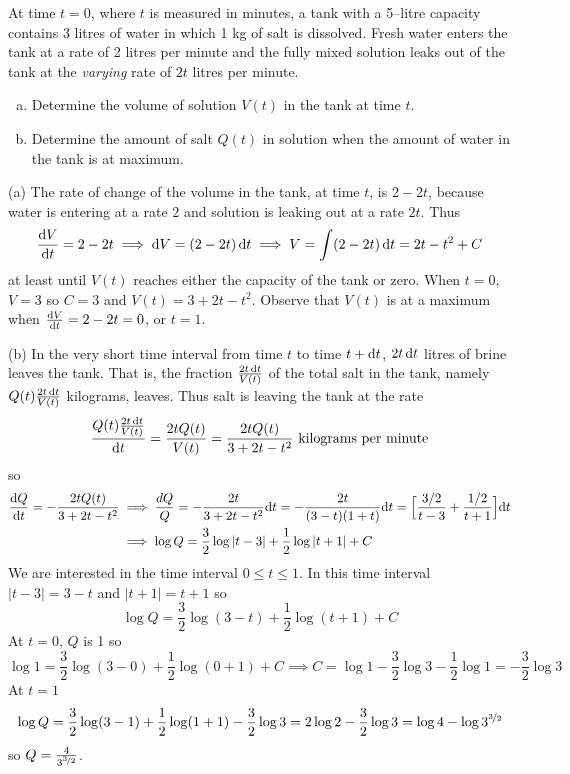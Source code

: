 \begin{eg}\label{eg:SDEmixingA}
At time $t=0$, where $t$ is measured in minutes, a tank with
a 5--litre capacity contains 3 litres of water in which 1 kg of salt
is dissolved. Fresh water enters the tank at a rate of 2 litres per
minute and the fully mixed solution leaks out of the tank at the
\emph{varying} rate of $2t$ litres per minute.
\begin{enumerate}[(a)]
\item Determine the volume of solution $V(t)$ in the tank at time
$t$.
\item Determine the amount of salt $Q(t)$ in solution when the
amount of water in the tank is at maximum.
\end{enumerate}

\soln (a) The rate of change of the volume in the tank, at time $t$,
is $2-2t$, because water is entering at a rate $2$ and solution is
leaking out at a rate $2t$. Thus
\begin{equation*}
\diff{V}{t}=2-2t
\implies \dee{V}=(2-2t)\,\dee{t}
\implies V=\int (2-2t)\,\dee{t}
=2t-t^2+C
\end{equation*}
at least until $V(t)$ reaches either the capacity of the tank or zero.
When $t=0$, $V=3$ so $C=3$ and $V(t)=3+2t-t^2$. Observe that
$V(t)$ is at a maximum when $\diff{V}{t}=2-2t=0$, or $t=1$.

\medskip
\noindent (b) In the very short time interval from time $t$ to time $t+\mathrm{d}t$,
 $2t\,\mathrm{d}t$ litres of brine leaves the tank. That is, the fraction
$\frac{2t\,\mathrm{d}t}{V(t)}$ of the total salt in the tank,
namely $Q(t)\frac{2t\,\mathrm{d}t}{V(t)}$ kilograms, leaves. Thus salt is leaving the
tank at the rate
\begin{equation*}
\frac{Q(t)\frac{2t\,\mathrm{d}t}{V(t)}}{\mathrm{d}t}
=\frac{2tQ(t)}{V(t)}
=\frac{2tQ(t)}{3+2t-t^2} \text{ kilograms per minute}
\end{equation*}
so
\begin{align*}
\diff{Q}{t}=-\frac{2tQ(t)}{3+2t-t^2}
&\implies
\frac{dQ}{Q}=-\frac{2t}{3+2t-t^2}\dee{t}=-\frac{2t}{(3-t)(1+t)}\dee{t}
=\Big[\frac{3/2}{t-3}+\frac{1/2}{t+1}\Big]\dee{t}\\
&\implies
\log Q=\frac{3}{2}\log|t-3|+\frac{1}{2}\log|t+1|+C
\end{align*}
We are interested in the time interval $0\le t\le 1$. In this time interval
$|t-3|=3-t$ and $|t+1|=t+1$ so
\begin{equation*}
\log Q=\frac{3}{2}\log(3-t)+\frac{1}{2}\log(t+1)+C
\end{equation*}
At $t=0$, $Q$ is 1 so
\begin{equation*}
\log 1=\frac{3}{2}\log(3-0)+\frac{1}{2}\log(0+1)+C
\implies
C=\log 1-\frac{3}{2}\log 3-\frac{1}{2}\log 1=-\frac{3}{2}\log 3
\end{equation*}
At $t=1$
\begin{equation*}
\log Q=\frac{3}{2}\log(3-1)+\frac{1}{2}\log(1+1)-\frac{3}{2}\log 3
=2\log 2-\frac{3}{2}\log 3
=\log 4 -\log 3^{\nicefrac{3}{2}}
\end{equation*}
so $Q=\frac{4}{3^{\nicefrac{3}{2}}}$.
\end{eg}
\goodbreak

